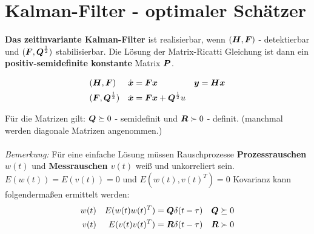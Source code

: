 \columnbreak

\section{Kalman-Filter - optimaler Schätzer}
\begin{tcolorbox}[colback=white!10!white,colframe=green!30!black] 
    \textbf{Das zeitinvariante Kalman-Filter} ist realisierbar, wenn
    $(\boldsymbol{H},\boldsymbol{F})$ - detektierbar und $(\boldsymbol{F},\boldsymbol{Q}^{\frac{1}{2}})$ stabilisierbar. Die Lösung der Matrix-Ricatti Gleichung ist dann ein \textbf{positiv-semidefinite konstante} Matrix $\boldsymbol{P}$. 
    \begin{tcolorbox}[colback=white!10!white,colframe=green!30!black]
        \begin{align*}
        &    (\boldsymbol{H},\boldsymbol{F})& &\dot{\boldsymbol{x}} = \boldsymbol{Fx} & &\boldsymbol{y} = \boldsymbol{Hx}\\
        &    (\boldsymbol{F},\boldsymbol{Q}^{\frac{1}{2}})&& \dot{\boldsymbol{x}} = \boldsymbol{Fx}+\boldsymbol{Q}^{\frac{1}{2}}u & &
        \end{align*}
    \end{tcolorbox}
    
    Für die Matrizen gilt: $\boldsymbol{Q}\succeq0$ - semidefinit und $\boldsymbol{R}\succ0$ - definit. (manchmal werden diagonale Matrizen angenommen.)
    \\\\
    \textit{Bemerkung:} Für eine einfache Lösung müssen Rauschprozesse \textbf{Prozessrauschen $w(t)$} und \textbf{Messrauschen $v(t)$} weiß und unkorreliert sein. $E(w(t))= E(v(t)) =0$ und $E(w(t),v(t)^T)=0$
    Kovarianz kann folgendermaßen ermittelt werden:
        \begin{align*}
            w(t) & & E(w(t)w(t)^T) =\boldsymbol{Q}\delta(t-\tau) && \boldsymbol{Q} \succeq 0 \\ v(t) & & E(v(t)v(t)^T) = \boldsymbol{R}\delta(t-\tau) && \boldsymbol{R} \succ 0
         \end{align*}
    

\end{tcolorbox}
